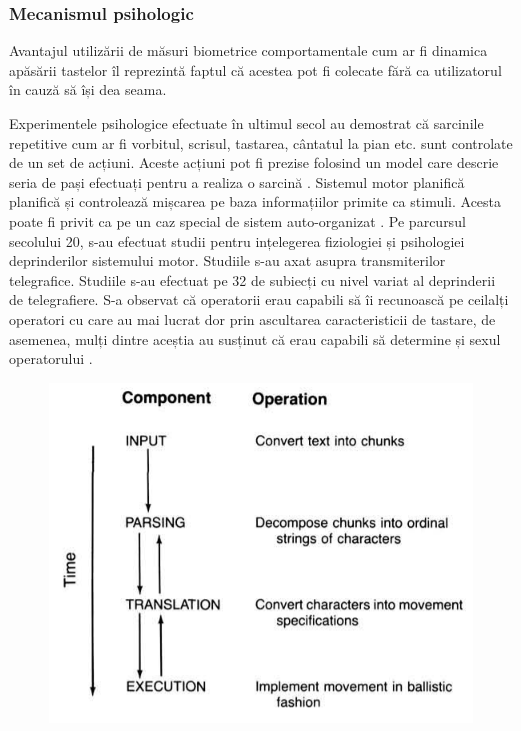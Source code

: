 \documentclass[9pt,shortpaper,twoside,web]{ieeecolor}
\begin{document}
\subsubsection{Mecanismul psihologic}
	Avantajul utilizării de măsuri biometrice comportamentale cum ar fi dinamica apăsării tastelor îl reprezintă faptul că acestea pot fi colecate fără ca utilizatorul în cauză să își dea seama. 
	
	Experimentele psihologice efectuate în ultimul secol au demostrat că sarcinile repetitive cum ar fi vorbitul, scrisul, tastarea, cântatul la pian etc. sunt controlate de un set de acțiuni. Aceste acțiuni pot fi prezise folosind un model care descrie seria de pași efectuați pentru a realiza o sarcină \cite{b3}. Sistemul motor planifică planifică și controlează mișcarea pe baza informațiilor primite ca stimuli. Acesta poate fi privit ca pe un caz special de sistem auto-organizat \cite{4}. Pe parcursul secolului 20, s-au efectuat studii pentru ințelegerea fiziologiei și psihologiei deprinderilor sistemului motor. Studiile s-au axat asupra transmiterilor telegrafice. Studiile s-au efectuat pe 32 de subiecți cu nivel variat al deprinderii de telegrafiere. S-a observat că operatorii erau capabili să îi recunoască pe ceilalți operatori cu care au mai lucrat dor prin ascultarea caracteristicii de tastare, de asemenea, mulți dintre aceștia au susținut că erau capabili să determine și sexul operatorului \cite{b3}. 
	
\begin{figure}[htb]
\includegraphics[width=0.9\columnwidth]{res/fig/modelul-cooper}
\caption{ \cite{b5}}
\label{fig1}
\end{figure}
\end{document}
